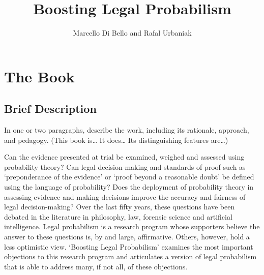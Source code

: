 \documentclass[10pt,dvipsnames,enabledeprecatedfontcommands]{scrartcl}
\title{Boosting Legal Probabilism}
\author{Marcello Di Bello and Rafal Urbaniak}
\date{}
\begin{document}
\maketitle

\hypertarget{the-book}{%
\section{The Book}\label{the-book}}

\hypertarget{brief-description}{%
\subsection{Brief Description}\label{brief-description}}

\footnotesize In one or two paragraphs, describe the work, including its
rationale, approach, and pedagogy. (This book is\ldots{} It does\ldots{}
Its distinguishing features are\ldots{})

\normalsize

Can the evidence presented at trial be examined, weighed and assessed
using probability theory? Can legal decision-making and standards of
proof such as `preponderance of the evidence' or `proof beyond a
reasonable doubt' be defined using the language of probability? Does the
deployment of probability theory in assessing evidence and making
decisions improve the accuracy and fairness of legal decision-making?
Over the last fifty years, these questions have been debated in the
literature in philosophy, law, forensic science and artificial
intelligence. Legal probabilism is a research program whose supporters
believe the answer to these questions is, by and large, affirmative.
Others, however, hold a less optimistic view. `Boosting Legal
Probabilism' examines the most important objections to this research
program and articulates a version of legal probabilism that is able to
address many, if not all, of these objections.
\end{document}
